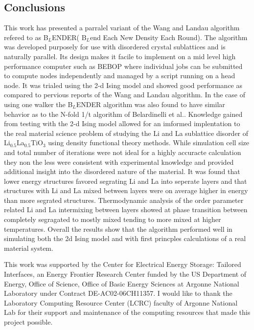 \documentclass[aps,prl,reprint,superscriptaddress,showkeys]{revtex4-1}
\begin{document}
\subsection{Conclusions}
 This work has presented a parralel variant of the Wang and Landau algorithm refered to as B$_L$ENDER( B$_L$end Each New Density Each Round). The algorithm was developed purposely for use with disordered crystal sublattices and is naturally parallel. Its design makes it facile to implement on a mid level high performance computer such as BEBOP where individual jobs can be submitted to compute nodes independently and managed by a script running on a head node. It was trialed using the 2-d Ising model and showed good performance as compared to pervious reports of the Wang and Landau algorithm. In the case of using one walker the B$_L$ENDER algorithm was also found to have similar behavior as to the N-fold 1/t algorithm of Belardinelli et al.. Knowledge gained from testing with the 2-d Ising model allowed for an imformed implentation to the real material science problem of studying the Li and La sublattice disorder of Li$_{0.5}$La$_{0.5}$TiO$_{3}$ using density functional theory methods. While simulation cell size and total number of iterations were not ideal for a highly accuracte calculation they non the less were consistent with experimental knowledge and provided additional insight into the disordered nature of the material. It was found that lower energy structures favored segrating Li and La into seperate layers and that structures with Li and La mixed between layers were on average higher in energy than more segrated structures. Thermodynamic analysis of the order parameter related Li and La intermixing between layers showed at phase transition between completely segragated  to mostly mixed tending to more mixed at higher temperatures. Overall the results show that the algorithm performed well in simulating both the 2d Ising model and with first princples calculations of a real material system. 

\begin{acknowledgments}
This work was supported by the Center for Electrical Energy Storage: Tailored Interfaces, an Energy Frontier Research Center funded 
by the US Department of Energy, Office of Science, Office of Basic Energy Sciences at Argonne National Laboratory under Contract DE-AC02-06CH11357.
I would like to thank the Laboratory Computing Resource Center (LCRC) faculty of Argonne National Lab for their support and maintenance of the computing resources that made this project possible. 
\end{acknowledgments}


\end{document}
